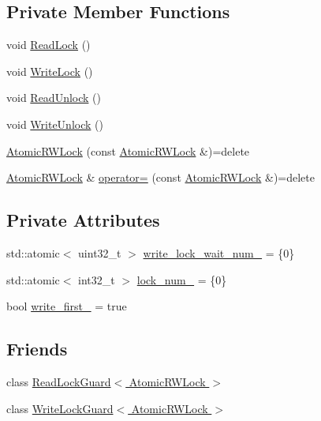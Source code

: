 \subsection*{Private Member Functions}
\begin{DoxyCompactItemize}
\item 
void \hyperlink{classapollo_1_1cyber_1_1base_1_1AtomicRWLock_a4d45cdc1aeaaf52cf7e921ef84bc69a9}{Read\-Lock} ()
\item 
void \hyperlink{classapollo_1_1cyber_1_1base_1_1AtomicRWLock_a7837026bb217ea454dc683d7b6531c00}{Write\-Lock} ()
\item 
void \hyperlink{classapollo_1_1cyber_1_1base_1_1AtomicRWLock_a5394b943ae73dea59b98882411610724}{Read\-Unlock} ()
\item 
void \hyperlink{classapollo_1_1cyber_1_1base_1_1AtomicRWLock_a26e5a8629da1eef7b544c5f5639d1b2c}{Write\-Unlock} ()
\item 
\hyperlink{classapollo_1_1cyber_1_1base_1_1AtomicRWLock_ae3d12c1d8676b8ad4b1174b38d3bff19}{Atomic\-R\-W\-Lock} (const \hyperlink{classapollo_1_1cyber_1_1base_1_1AtomicRWLock}{Atomic\-R\-W\-Lock} \&)=delete
\item 
\hyperlink{classapollo_1_1cyber_1_1base_1_1AtomicRWLock}{Atomic\-R\-W\-Lock} \& \hyperlink{classapollo_1_1cyber_1_1base_1_1AtomicRWLock_a8f6c54b39ff17f2ac4b4cf1c5855d484}{operator=} (const \hyperlink{classapollo_1_1cyber_1_1base_1_1AtomicRWLock}{Atomic\-R\-W\-Lock} \&)=delete
\end{DoxyCompactItemize}
\subsection*{Private Attributes}
\begin{DoxyCompactItemize}
\item 
std\-::atomic$<$ uint32\-\_\-t $>$ \hyperlink{classapollo_1_1cyber_1_1base_1_1AtomicRWLock_a1b6e55bbdbe5579f2e6285a1f56ef5f2}{write\-\_\-lock\-\_\-wait\-\_\-num\-\_\-} = \{0\}
\item 
std\-::atomic$<$ int32\-\_\-t $>$ \hyperlink{classapollo_1_1cyber_1_1base_1_1AtomicRWLock_adc27774c468c75ba9c8658ed5d194719}{lock\-\_\-num\-\_\-} = \{0\}
\item 
bool \hyperlink{classapollo_1_1cyber_1_1base_1_1AtomicRWLock_af446ca384d8cd987ac6cd9f742004748}{write\-\_\-first\-\_\-} = true
\end{DoxyCompactItemize}
\subsection*{Friends}
\begin{DoxyCompactItemize}
\item 
class \hyperlink{classapollo_1_1cyber_1_1base_1_1AtomicRWLock_ae3346b483392ff21d4bbdce25f722d10}{Read\-Lock\-Guard$<$ Atomic\-R\-W\-Lock $>$}
\item 
class \hyperlink{classapollo_1_1cyber_1_1base_1_1AtomicRWLock_a6f70f95c6312deffd395854efd15b7fd}{Write\-Lock\-Guard$<$ Atomic\-R\-W\-Lock $>$}
\end{DoxyCompactItemize}


